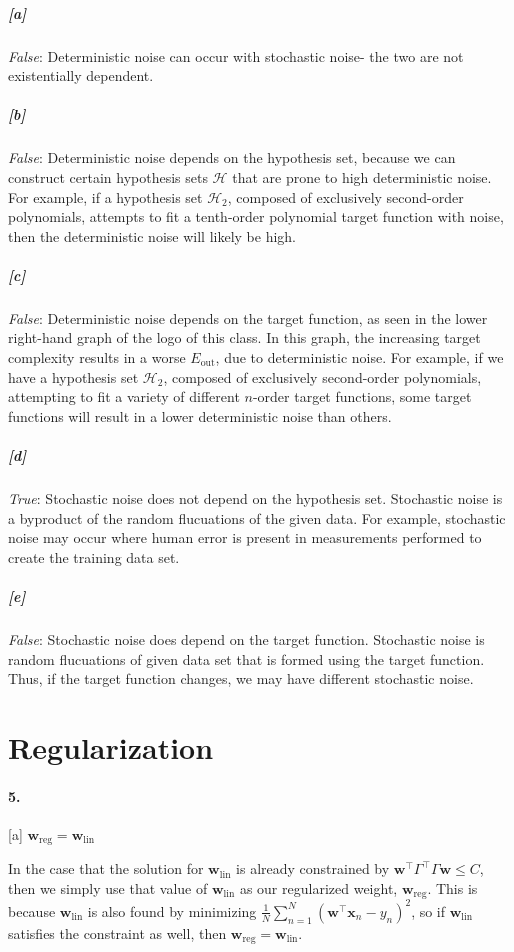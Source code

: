 \documentclass[titlepage]{article}
\newcommand*{\tran}{\intercal}
\newcommand*{\lin}{\text{lin}}
\newcommand*{\reg}{\text{reg}}
\begin{document}
	\subparagraph{[a]} \textit{False}: Deterministic noise can occur with stochastic noise- the two are not existentially dependent.

	\subparagraph{[b]} \textit{False}: Deterministic noise depends on the hypothesis set, because we can construct certain hypothesis sets $\mathcal H$ that are prone to high deterministic noise. For example, if a hypothesis set $\mathcal H_2$, composed of exclusively second-order polynomials, attempts to fit a tenth-order polynomial target function with noise, then the deterministic noise will likely be high. 

	\subparagraph{[c]} \textit{False}: Deterministic noise depends on the target function, as seen in the lower right-hand graph of the logo of this class. In this graph, the increasing target complexity results in a worse $E_{\text{out}}$, due to deterministic noise. For example, if we have a hypothesis set $\mathcal H_2$, composed of exclusively second-order polynomials, attempting to fit a variety of different $n$-order target functions, some target functions will result in a lower deterministic noise than others.

	\subparagraph{[d]} \textit{True}: Stochastic noise does not depend on the hypothesis set. Stochastic noise is a byproduct of the random flucuations of the given data. For example, stochastic noise may occur where human error is present in measurements performed to create the training data set.

	\subparagraph{[e]} \textit{False}: Stochastic noise does depend on the target function. Stochastic noise is random flucuations of given data set that is formed using the target function. Thus, if the target function changes, we may have different stochastic noise.

\section*{Regularization}
\paragraph{5.} [a] $\bm w_{\reg} = \bm w_{\lin}$

	In the case that the solution for $\bm w_{\lin}$ is already constrained by $\bm w^\tran \Gamma^\tran\Gamma \bm w \leq C$, then we simply use that value of $\bm w_{\lin}$ as our regularized weight, $\bm w_{\reg}$. This is because $\bm w_{\lin}$ is also found by minimizing $\frac{1}{N} \sum_{n=1}^N (\bm w^\tran \bm x_n- y_n)^2 $, so if $\bm w_{\lin}$ satisfies the constraint as well, then $\bm w_{\reg} = \bm w_{\lin}$.
\end{document}
